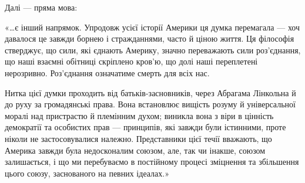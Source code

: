 Далі — пряма мова:

«…є інший напрямок. Упродовж усієї історії Америки ця думка перемагала — хоч
давалося це завжди борнею і стражданнями, часто й ціною життя. Ця філософія
стверджує, що сили, які єднають Америку, значно переважають сили роз’єднання,
що наші взаємні обітниці скріплено кров’ю, що долі наші переплетені нерозривно.
Роз’єднання означатиме смерть для всіх нас. 

Нитка цієї думки проходить від батьків-засновників, через Абрагама Лінкольна й
до руху за громадянські права. Вона встановлює вищість розуму й універсальної
моралі над пристрастю й племінним духом; виникла вона з віри в цінність
демократії та особистих прав — принципів, які завжди були істинними, проте
ніколи не застосовувалися належно. Представники цієї течії вважають, що Америка
завжди була недосконалим союзом, але, так чи інакше, союзом залишається, і що
ми перебуваємо в постійному процесі зміцнення та збільшення цього союзу,
заснованого на певних ідеалах.»
